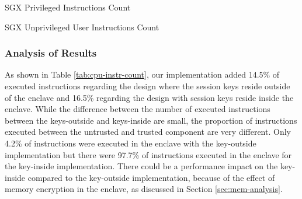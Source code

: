 \documentclass[../../../main.tex]{subfiles}
\begin{document}
\begin{table}[H]
  \center
  \footnotesize
  \caption{SGX Privileged Instructions Count}
  \label{tab:sgx-encls}
\end{table}

\begin{table}[H]
  \caption{SGX Unprivileged User Instructions Count}
  \label{tab:sgx-enclu}
\end{table}

\subsubsection*{Analysis of Results}
As shown in Table \ref{tab:cpu-instr-count}, our implementation added 14.5\% of
executed instructions regarding the design where the session keys reside
outside of the enclave and 16.5\% regarding the design with session keys
reside inside the enclave. While the difference between the number of executed
instructions between the keys-outside and keys-inside are small, the proportion
of instructions executed between the untrusted and trusted component are very
different. Only 4.2\% of instructions were executed in the enclave with the
key-outside implementation but there were 97.7\% of instructions executed in
the enclave for the key-inside implementation. There could be a performance
impact on the key-inside compared to the key-outside implementation, because of
the effect of memory encryption in the enclave, as discussed in Section
\ref{sec:mem-analysis}.
\end{document}
